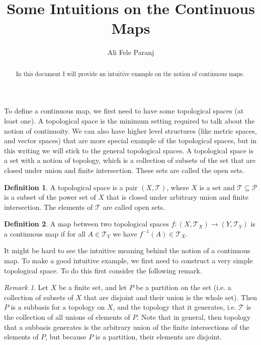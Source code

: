 \documentclass[11pt,a4paper]{article}
\title{Some Intuitions on the Continuous Maps}
\author{Ali Fele Paranj}
\theoremstyle{definition}
\newtheorem{definition}{Definition}
\theoremstyle{remark}
\newtheorem{remark}{Remark}
\begin{document}
	
	\maketitle
	\begin{abstract}
		In this document I will provide an intuitive example on the notion of continuous maps.
	\end{abstract}
	
	To define a continuous map, we first need to have some topological spaces (at least one). A topological space is the minimum setting required to talk about the notion of continuoity. We can also have higher level structures (like metric spaces, and vector spaces) that are more special example of the topological spaces, but in this writing we will stick to the general topological spaces. A topological space is a set with a notion of topology, which is a collection of subsets of the set that are closed under union and finite intersection. These sets are called the open sets.
	
	
	\begin{definition}
		A topological space is a pair $ (X,\mathcal{T}) $, where $ X $ is a set and $ \mathcal{T} \subseteq \mathcal{P} $ is a subset of the power set of $ X $ that is closed under arbitrary union and finite intersection. The elements of $ \mathcal{T} $ are called open sets.
	\end{definition}
	
	
	\begin{definition}
		A map between two topological spaces $ f: (X,\mathcal{T}_X) \to (Y,\mathcal{T}_Y) $ is a continuous map if for all $ A \in \mathcal{T}_Y $ we have $ f^{-1}(A) \in \mathcal{T}_X $.
	\end{definition}
	
	It might be hard to see the intuitive meaning behind the notion of a continuous map. To make a good intuitive example, we first need to construct a very simple topological space. To do this first consider the following remark.
	
	\begin{remark}
		Let $ X $ be a finite set, and let $ P $ be a partition on the set (i.e. a collection of subsets of $ X $ that are disjoint and their union is the whole set). Then $ P $ is a subbasis for a topology on $ X $, and the topology that it generates, i.e. $ \mathcal{T} $ is the collection of all unions of elements of $ P $. Note that in general, then topology that a subbasis generates is the arbitrary union of the finite intersections of the elements of $ P $, but because $ P $ is a partition, their elements are disjoint.
	\end{remark}
	
\end{document}
